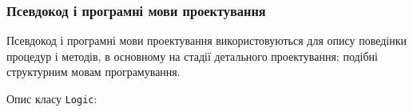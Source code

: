 \subsubsection{Псевдокод і програмні мови проектування}
Псевдокод і програмні мови проектування використовуються для опису поведінки процедур і методів, в основному на стадії детального проектування; подібні структурним мовам програмування.

Опис класу \texttt{Logic}:



